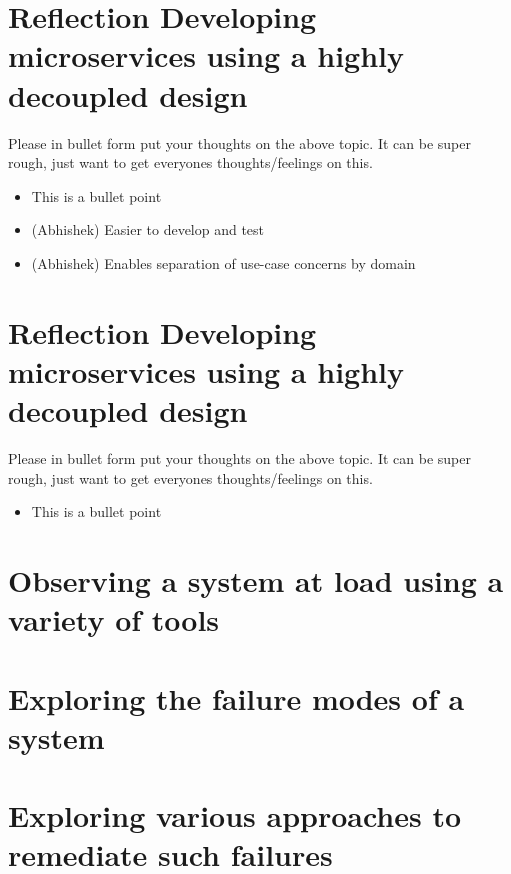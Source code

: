 \documentclass{article}
\begin{document}
\section{Reflection Developing microservices using a highly decoupled design}

Please in bullet form put your thoughts on the above topic.  It can be super rough, just want to get everyones thoughts/feelings on this.
\begin{itemize}
  \item This is a bullet point
  \item (Abhishek) Easier to develop and test
  \item (Abhishek) Enables separation of use-case concerns by domain

\end{itemize}

\section{Reflection Developing microservices using a highly decoupled design}

Please in bullet form put your thoughts on the above topic.  It can be super rough, just want to get everyones thoughts/feelings on this.
\begin{itemize}
  \item This is a bullet point

\end{itemize}

\section{ Observing a system at load using a variety of tools}

\section{ Exploring the failure modes of a system}

\section{Exploring various approaches to remediate such failures}
\end{document}
